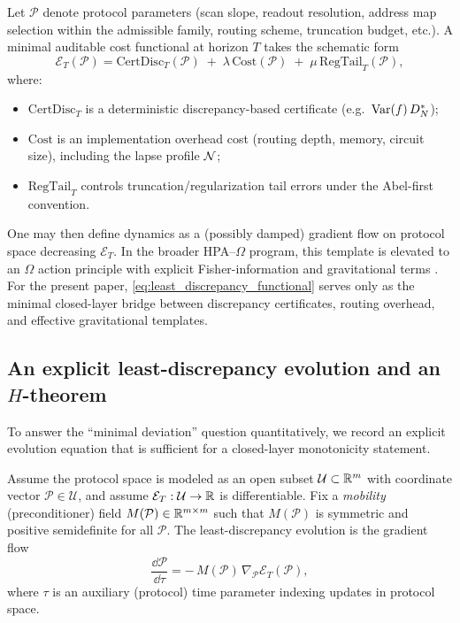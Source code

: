 Let $\mathcal{P}$ denote protocol parameters (scan slope, readout resolution, address map selection within the admissible family, routing scheme, truncation budget, etc.).
A minimal auditable cost functional at horizon $T$ takes the schematic form
\begin{equation}
\label{eq:least_discrepancy_functional}
\mathcal{E}_T(\mathcal{P})
=
\mathrm{CertDisc}_T(\mathcal{P})
\;+\;
\lambda\,\mathrm{Cost}(\mathcal{P})
\;+\;
\mu\,\mathrm{RegTail}_T(\mathcal{P}),
\end{equation}
where:
\begin{itemize}
\item $\mathrm{CertDisc}_T$ is a deterministic discrepancy-based certificate (e.g.\ $\mathrm{Var}(f)\,D_N^\ast$);
\item $\mathrm{Cost}$ is an implementation overhead cost (routing depth, memory, circuit size), including the lapse profile $\mathcal{N}$;
\item $\mathrm{RegTail}_T$ controls truncation/regularization tail errors under the Abel-first convention.
\end{itemize}

One may then define dynamics as a (possibly damped) gradient flow on protocol space decreasing $\mathcal{E}_T$.
In the broader HPA--$\Omega$ program, this template is elevated to an $\Omega$ action principle with explicit Fisher-information and gravitational terms \cite{Ma2025CAP}.
For the present paper, \eqref{eq:least_discrepancy_functional} serves only as the minimal closed-layer bridge between discrepancy certificates, routing overhead, and effective gravitational templates.

\subsection{An explicit least-discrepancy evolution and an \texorpdfstring{$H$}{H}-theorem}
\label{sec:least_discrepancy_h_theorem}

To answer the ``minimal deviation'' question quantitatively, we record an explicit evolution equation that is sufficient for a closed-layer monotonicity statement.

\begin{definition}
\label{def:least_discrepancy_flow}
Assume the protocol space is modeled as an open subset $\mathcal{U}\subset\mathbb{R}^m$ with coordinate vector $\mathcal{P}\in\mathcal{U}$, and assume $\mathcal{E}_T:\mathcal{U}\to\mathbb{R}$ is differentiable.
Fix a \emph{mobility} (preconditioner) field $M(\mathcal{P})\in\mathbb{R}^{m\times m}$ such that $M(\mathcal{P})$ is symmetric and positive semidefinite for all $\mathcal{P}$.
The least-discrepancy evolution is the gradient flow
\begin{equation}
\label{eq:least_discrepancy_flow}
\frac{\dd \mathcal{P}}{\dd \tau}=-\,M(\mathcal{P})\,\nabla_{\mathcal{P}}\mathcal{E}_T(\mathcal{P}),
\end{equation}
where $\tau$ is an auxiliary (protocol) time parameter indexing updates in protocol space.
\end{definition}

